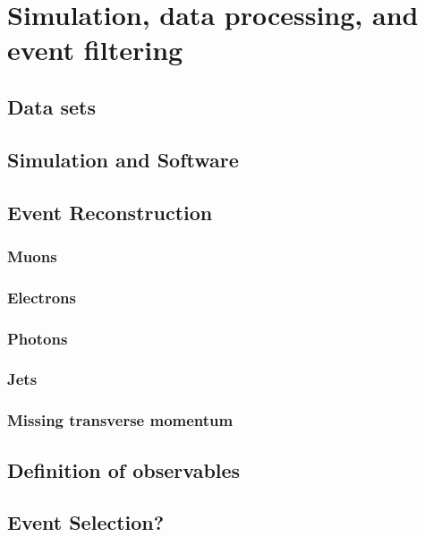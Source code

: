 \chapter{Simulation, data processing, and event filtering}\label{chap:reco}

\section{Data sets}
\section{Simulation and Software}
\section{Event Reconstruction}
\subsection{Muons}
\subsection{Electrons}
\subsection{Photons}
\subsection{Jets}
\subsection{Missing transverse momentum}
\section{Definition of observables}

\section{Event Selection?}
